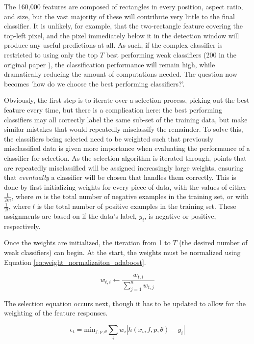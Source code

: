 \documentclass[11pt,a4paper,oldfontcommands]{memoir}
\begin{document}
The 160,000 features are composed of rectangles in every position, aspect ratio, and size, but the vast majority of these will contribute very little to the final classifier. It is unlikely, for example, that the two-rectangle feature covering the top-left pixel, and the pixel immediately below it in the detection window will produce any useful predictions at all. As such, if the complex classifier is restricted to using only the top $T$ best performing weak classifiers (200 in the original paper \cite{viola}), the classification performance will remain high, while dramatically reducing the amount of computations needed. The question now becomes 'how do we choose the best performing classifiers?'. 

Obviously, the first step is to iterate over a selection process, picking out the best feature every time, but there is a complication here: the best performing classifiers may all correctly label the same sub-set of the training data, but make similar mistakes that would repeatedly misclassify the remainder. To solve this, the classifiers being selected need to be weighted such that previously misclassified data is given more importance when evaluating the performance of a classifier for selection. As the selection algorithm is iterated through, points that are repeatedly misclassified will be assigned increasingly large weights, ensuring that \textit{eventually} a classifier will be chosen that handles them correctly. This is done by first initializing weights for every piece of data, with the values of either $\frac{1}{2m}$, where $m$ is the total number of negative examples in the training set, or with $\frac{1}{2l}$, where $l$ is the total number of positive examples in the training set. These assignments are based on if the data's label, $y_i$, is negative or positive, respectively.

Once the weights are initialized, the iteration from 1 to $T$ (the desired number of weak classifiers) can begin. At the start, the weights must be normalized using Equation \ref{eq:weight_normalizaiton_adaboost}.

\begin{equation}
    w_{t,i} \leftarrow \frac{w_{t,i}}{\sum^n_{j=1} w_{t,j}}
    \label{eq:weight_normalizaiton_adaboost}
\end{equation}

The selection equation occurs next, though it has to be updated to allow for the weighting of the feature responses.

\begin{equation}
    \epsilon_t = \textrm{min}_{f,p,\theta} \sum\limits_{i} w_i |  h(x_i, f, p, \theta) - y_i|
\end{equation}
\end{document}
